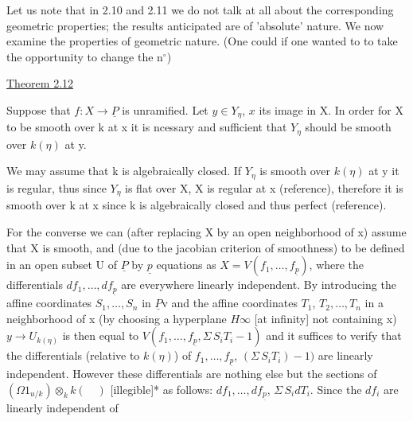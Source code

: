 
Let us note that in 2.10 and 2.11 we do not talk at all about
the corresponding geometric properties; the results anticipated
are of 'absolute' nature.  We now examine the properties of
geometric nature. (One could if one wanted to to take the
opportunity to change the n$^\circ$)

\uline{Theorem 2.12}

Suppose that $f{:}X \to \underline{P}$ is unramified.  Let $y \in Y_{\eta}$, $x$ its image
in X.  In order for X to be smooth over k at x it is ncessary and
sufficient that $Y_{\eta}$ should be smooth over $k(\eta)$ at y.

We may assume that k is algebraically closed.  If $Y_{\eta}$ is smooth
over $k(\eta)$ at y it is regular, thus since $Y_{\eta}$ is flat over X, X is
regular at x (reference), therefore it is smooth over k at x since
k is algebraically closed and thus perfect (reference).

For the converse we can (after replacing X by an open
neighborhood of x) assume that X is smooth, and (due to the
jacobian criterion of smoothness) to be defined in an open subset
U of $\underline{P}$ by $\underline{p}$ equations as $X = V(f_1,\ldots,f_{\underline{p}})$, where the differentials
$df_1,\ldots,df_{\underline{p}}$ are everywhere linearly independent.  By introducing
the affine coordinates $S_1,\ldots,S_n$ in $\underline{P}$v and the affine coordinates
$T_1$, $T_2,\ldots,T_n$ in a neighborhood of x (by choosing a hyperplane $H\infty$
[at infinity] not containing x) $y \to U_{k(\eta)}$ is then equal to
$V(f_1,\ldots,f_{\underline{p}}, \Sigma\, S_iT_i - 1)$ and it suffices to verify that the
differentials (relative to $k(\eta)$) of $f_1,\ldots,f_{\underline{p}}$, $(\Sigma\, S_iT_i) - 1)$ are
linearly independent.  However these differentials are nothing
else but the sections of $(\Omega 1_{u/k}) \otimes_k k(\quad)$ [illegible]* as follows:
$df_1,\ldots,df_{\underline{p}}$, $\Sigma\, S_i dT_i$.  Since the $df_i$ are linearly independent of

